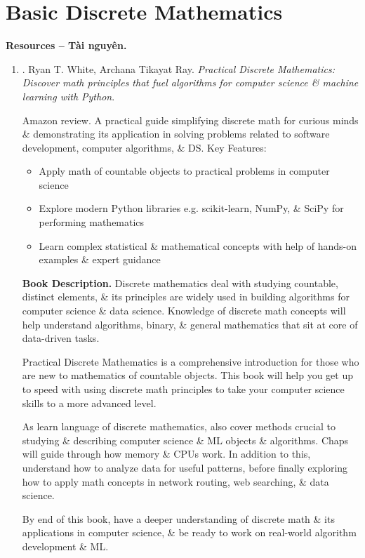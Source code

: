\documentclass{article}
\begin{document}
\section{Basic Discrete Mathematics}
\textbf{\textsf{Resources -- Tài nguyên.}}
\begin{enumerate}
	\item \cite{White_Ray2021}. {\sc Ryan T. White, Archana Tikayat Ray}. {\it Practical Discrete Mathematics: Discover math principles that fuel algorithms for computer science \& machine learning with Python}. {}
	
	{\sf Amazon review.} A practical guide simplifying discrete math for curious minds \& demonstrating its application in solving problems related to software development, computer algorithms, \& DS. Key Features:
	\begin{itemize}
		\item Apply math of countable objects to practical problems in computer science
		\item Explore modern Python libraries e.g. scikit-learn, NumPy, \& SciPy for performing mathematics
		\item Learn complex statistical \& mathematical concepts with help of hands-on examples \& expert guidance
	\end{itemize}
	{\bf Book Description.} Discrete mathematics deal with studying countable, distinct elements, \& its principles are widely used in building algorithms for computer science \& data science. Knowledge of discrete math concepts will help understand algorithms, binary, \& general mathematics that sit at core of data-driven tasks.
	
	Practical Discrete Mathematics is a comprehensive introduction for those who are new to mathematics of countable objects. This book will help you get up to speed with using discrete math principles to take your computer science skills to a more advanced level.
	
	As learn language of discrete mathematics, also cover methods crucial to studying \& describing computer science \& ML objects \& algorithms. Chaps will guide through how memory \& CPUs work. In addition to this, understand how to analyze data for useful patterns, before finally exploring how to apply math concepts in network routing, web searching, \& data science.
	
	By end of this book, have a deeper understanding of discrete math \& its applications in computer science, \& be ready to work on real-world algorithm development \& ML.
	

\end{enumerate}
\end{document}
